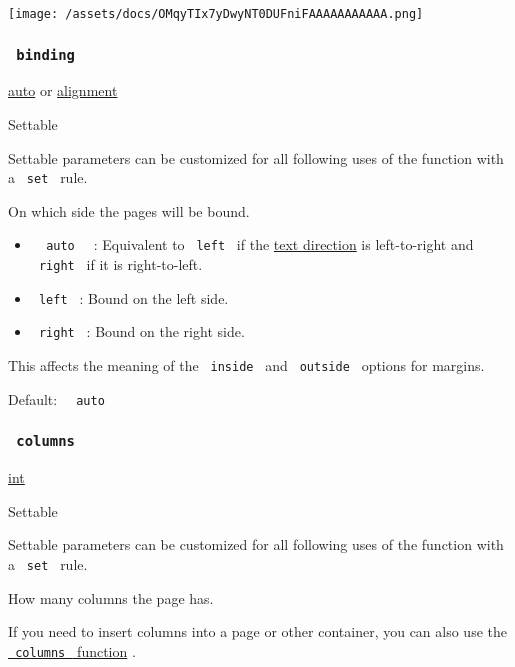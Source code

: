 \texttt{[image: /assets/docs/OMqyTIx7yDwyNT0DUFniFAAAAAAAAAAA.png]}

\subsubsection{\texorpdfstring{\texttt{\ binding\ }}{ binding }}\label{parameters-binding}

\href{/docs/reference/foundations/auto/}{auto} {or}
\href{/docs/reference/layout/alignment/}{alignment}

{{ Settable }}

\label{parameters-binding-settable-tooltip}
Settable parameters can be customized for all following uses of the
function with a \texttt{\ set\ } rule.

On which side the pages will be bound.

\begin{itemize}
\tightlist
\item
  \texttt{\ }{\texttt{\ auto\ }}\texttt{\ } : Equivalent to
  \texttt{\ left\ } if the
  \href{/docs/reference/text/text/\#parameters-dir}{text direction} is
  left-to-right and \texttt{\ right\ } if it is right-to-left.
\item
  \texttt{\ left\ } : Bound on the left side.
\item
  \texttt{\ right\ } : Bound on the right side.
\end{itemize}

This affects the meaning of the \texttt{\ inside\ } and
\texttt{\ outside\ } options for margins.

Default: \texttt{\ }{\texttt{\ auto\ }}\texttt{\ }

\subsubsection{\texorpdfstring{\texttt{\ columns\ }}{ columns }}\label{parameters-columns}

\href{/docs/reference/foundations/int/}{int}

{{ Settable }}

\label{parameters-columns-settable-tooltip}
Settable parameters can be customized for all following uses of the
function with a \texttt{\ set\ } rule.

How many columns the page has.

If you need to insert columns into a page or other container, you can
also use the \href{/docs/reference/layout/columns/}{\texttt{\ columns\ }
function} .

